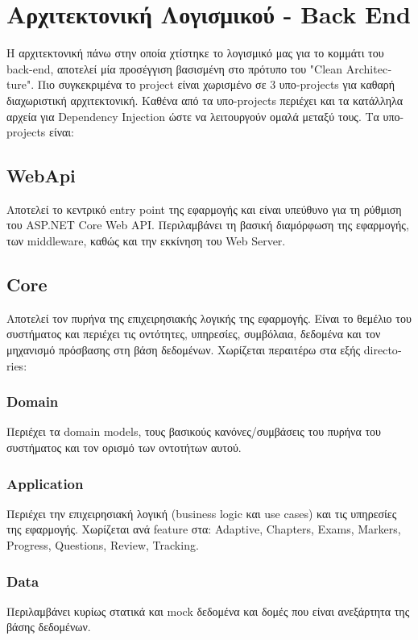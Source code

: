 \section{Αρχιτεκτονική Λογισμικού - \textlatin{Back End}}
Η αρχιτεκτονική πάνω στην οποία χτίστηκε το λογισμικό μας για το κομμάτι του \textlatin{back-end}, αποτελεί μία προσέγγιση βασισμένη στο πρότυπο του \textlatin{"Clean Architecture"}. Πιο συγκεκριμένα το \textlatin{project} είναι χωρισμένο σε 3 υπο‑\textlatin{projects} για καθαρή διαχωριστική αρχιτεκτονική. Καθένα από τα υπο-\textlatin{projects} περιέχει και τα κατάλληλα αρχεία για \textlatin{Dependency Injection} ώστε να λειτουργούν ομαλά μεταξύ τους. Τα υπο-\textlatin{projects} είναι: 

\subsection{\textlatin{WebApi}}
Αποτελεί το κεντρικό \textlatin{entry point} της εφαρμογής και είναι υπεύθυνο για τη ρύθμιση του \textlatin{ASP.NET Core Web API}. Περιλαμβάνει τη βασική διαμόρφωση της εφαρμογής, των \textlatin{middleware}, καθώς και την εκκίνηση του \textlatin{Web Server}.

\subsection{\textlatin{Core}}
Αποτελεί τον πυρήνα της επιχειρησιακής λογικής της εφαρμογής. Είναι το θεμέλιο του συστήματος και περιέχει τις οντότητες, υπηρεσίες, συμβόλαια, δεδομένα και τον μηχανισμό πρόσβασης στη βάση δεδομένων. Χωρίζεται περαιτέρω στα εξής \textlatin{directories}:

\subsubsection{\textlatin{Domain}}
Περιέχει τα \textlatin{domain models}, τους βασικούς κανόνες/συμβάσεις του πυρήνα του συστήματος και τον ορισμό των οντοτήτων αυτού. 

\subsubsection{\textlatin{Application}}
Περιέχει την επιχειρησιακή λογική (\textlatin{business logic} και \textlatin{use cases}) και τις υπηρεσίες της εφαρμογής. Χωρίζεται ανά \textlatin{feature} στα: \textlatin{Adaptive, Chapters, Exams, Markers, Progress, Questions, Review, Tracking}.

\subsubsection{\textlatin{Data}}
Περιλαμβάνει κυρίως στατικά και \textlatin{mock} δεδομένα και δομές που είναι ανεξάρτητα της βάσης δεδομένων.

